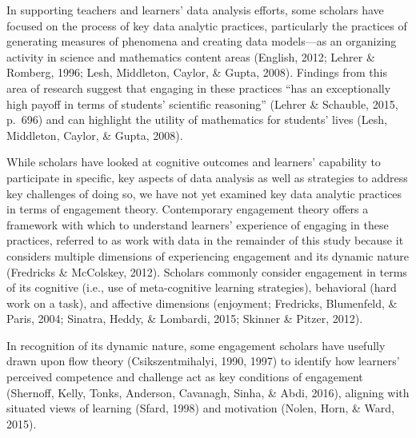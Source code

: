 \documentclass[]{book}
\begin{document}
In supporting teachers and learners' data analysis efforts, some
scholars have focused on the process of key data analytic practices,
particularly the practices of generating measures of phenomena and
creating data models---as an organizing activity in science and
mathematics content areas (English, 2012; Lehrer \& Romberg, 1996; Lesh,
Middleton, Caylor, \& Gupta, 2008). Findings from this area of research
suggest that engaging in these practices ``has an exceptionally high
payoff in terms of students' scientific reasoning'' (Lehrer \& Schauble,
2015, p.~696) and can highlight the utility of mathematics for students'
lives (Lesh, Middleton, Caylor, \& Gupta, 2008).

While scholars have looked at cognitive outcomes and learners'
capability to participate in specific, key aspects of data analysis as
well as strategies to address key challenges of doing so, we have not
yet examined key data analytic practices in terms of engagement theory.
Contemporary engagement theory offers a framework with which to
understand learners' experience of engaging in these practices, referred
to as work with data in the remainder of this study because it considers
multiple dimensions of experiencing engagement and its dynamic nature
(Fredricks \& McColskey, 2012). Scholars commonly consider engagement in
terms of its cognitive (i.e., use of meta-cognitive learning
strategies), behavioral (hard work on a task), and affective dimensions
(enjoyment; Fredricks, Blumenfeld, \& Paris, 2004; Sinatra, Heddy, \&
Lombardi, 2015; Skinner \& Pitzer, 2012).

In recognition of its dynamic nature, some engagement scholars have
usefully drawn upon flow theory (Csikszentmihalyi, 1990, 1997) to
identify how learners' perceived competence and challenge act as key
conditions of engagement (Shernoff, Kelly, Tonks, Anderson, Cavanagh,
Sinha, \& Abdi, 2016), aligning with situated views of learning (Sfard,
1998) and motivation (Nolen, Horn, \& Ward, 2015).
\end{document}
